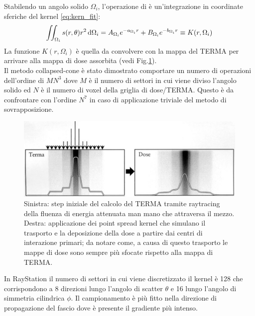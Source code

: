 {Stabilendo un angolo solido $\Omega_i$, l'operazione di  è un'integrazione in coordinate sferiche del kernel \eqref{eq:kern_fit}:
\begin{equation}
\iint_{\Omega_i} s(r,\theta) r^2\,\text{d} \Omega_i = A_{\Omega_i} e^{-a_{\Omega_i} r} + B_{\Omega_i} e^{-b_{\Omega_i} r} \equiv K(r,\Omega_i)
\end{equation}
La funzione $K(r,\Omega_i)$ è quella da convolvere con la mappa del TERMA per arrivare alla mappa di dose assorbita (vedi Fig.\ref{fig:dose_terma_homo}).\\
Il metodo collapsed-cone è stato dimostrato \cite{Ahnesjo1999} comportare un numero di operazioni dell'ordine di $MN^3$ dove $M$ è il numero di settori in cui viene diviso l'angolo solido ed $N$ è il numero di voxel della griglia di dose/TERMA. Questo è da confrontare con l'ordine $N^7$ in caso di applicazione triviale del metodo di sovrapposizione.
\begin{figure}
\centering
\includegraphics[width=\textwidth]{./cap1/dose_terma_homo.png}
\caption{Sinistra: step iniziale del calcolo del TERMA tramite raytracing della fluenza di energia attenuata man mano che attraversa il mezzo. Destra: applicazione dei point spread kernel che simulano il trasporto e la deposizione della dose a partire dai centri di interazione primari; da notare come, a causa di questo trasporto le mappe di dose sono sempre più sfocate rispetto alla mappa di TERMA.}
\label{fig:dose_terma_homo}
\end{figure}

In RayStation il numero di settori in cui viene discretizzato il kernel è 128 che corrispondono a 8 direzioni lungo l'angolo di scatter $\theta$ e 16 lungo l'angolo di simmetria cilindrica $\phi$. Il campionamento è più fitto nella direzione di propagazione del fascio dove è presente il gradiente più intenso.

}
